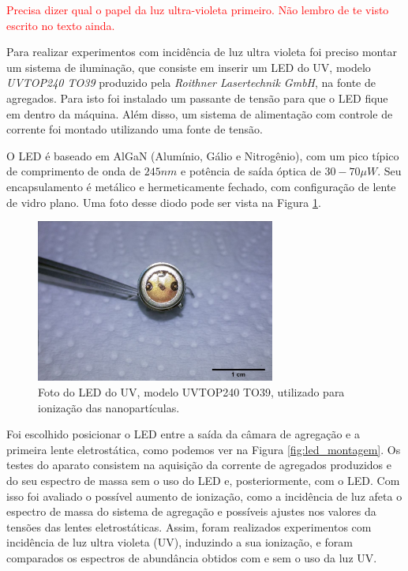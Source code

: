\textcolor{red}{Precisa dizer qual o papel da luz ultra-violeta primeiro. Não lembro de te visto escrito no texto ainda.}

Para realizar experimentos com incidência de luz ultra violeta foi preciso montar um sistema de iluminação, que consiste em inserir um LED do UV, modelo \textit{UVTOP240 TO39} produzido pela \textit{Roithner Lasertechnik GmbH}, na fonte de agregados. Para isto foi instalado um passante de tensão para que o LED fique em dentro da máquina. Além disso, um sistema de alimentação com controle de corrente foi montado utilizando uma fonte de tensão.

O LED é baseado em AlGaN (Alumínio, Gálio e Nitrogênio), com um pico típico de comprimento de onda de $245 nm$ e potência de saída óptica de $30-70 \mu W$. Seu encapsulamento é metálico e hermeticamente fechado, com configuração de lente de vidro plano. Uma foto desse diodo pode ser vista na Figura \ref{fig:foto_led}.

\begin{figure}
  \centering
  \includegraphics[width=0.7\textwidth]{images/foca/led_scale}
  \caption{ Foto do LED do UV, modelo UVTOP240 TO39, utilizado para ionização das nanopartículas.  }
  \label{fig:foto_led}
\end{figure}


Foi escolhido posicionar o LED entre a saída da câmara de agregação e a primeira lente eletrostática, como podemos ver na Figura \ref{fig:led_montagem}. Os testes do aparato consistem na aquisição da corrente de agregados produzidos e do seu espectro de massa sem o uso do LED e, posteriormente, com o LED. Com isso foi avaliado o possível aumento de ionização, como a incidência de luz afeta o espectro de massa do sistema de agregação e possíveis ajustes nos valores da tensões das lentes eletrostáticas.
Assim, foram realizados experimentos com incidência de luz ultra violeta (UV), induzindo a sua ionização, e foram comparados os espectros de abundância obtidos com e sem o uso da luz UV. 



